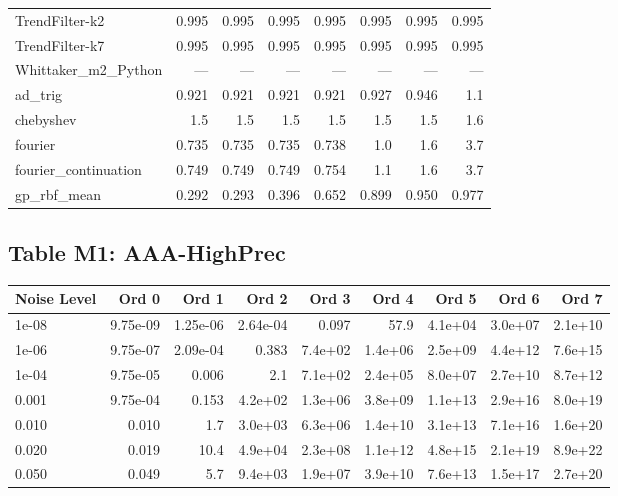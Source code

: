 \begin{longtable}{lrrrrrrr}
TrendFilter-k2 & 0.995 & 0.995 & 0.995 & 0.995 & 0.995 & 0.995 & 0.995 \\
TrendFilter-k7 & 0.995 & 0.995 & 0.995 & 0.995 & 0.995 & 0.995 & 0.995 \\
Whittaker\_m2\_Python & --- & --- & --- & --- & --- & --- & --- \\
ad\_trig & 0.921 & 0.921 & 0.921 & 0.921 & 0.927 & 0.946 & 1.1 \\
chebyshev & 1.5 & 1.5 & 1.5 & 1.5 & 1.5 & 1.5 & 1.6 \\
fourier & 0.735 & 0.735 & 0.735 & 0.738 & 1.0 & 1.6 & 3.7 \\
fourier\_continuation & 0.749 & 0.749 & 0.749 & 0.754 & 1.1 & 1.6 & 3.7 \\
gp\_rbf\_mean & 0.292 & 0.293 & 0.396 & 0.652 & 0.899 & 0.950 & 0.977 \\
\bottomrule
\end{longtable}

\clearpage



\subsection*{Table M1: AAA-HighPrec}

\begin{longtable}{lrrrrrrrr}
\toprule
\textbf{Noise Level} & \textbf{Ord 0} & \textbf{Ord 1} & \textbf{Ord 2} & \textbf{Ord 3} & \textbf{Ord 4} & \textbf{Ord 5} & \textbf{Ord 6} & \textbf{Ord 7} \\
\midrule
\endhead
1e-08 & 9.75e-09 & 1.25e-06 & 2.64e-04 & 0.097 & 57.9 & 4.1e+04 & 3.0e+07 & 2.1e+10 \\
1e-06 & 9.75e-07 & 2.09e-04 & 0.383 & 7.4e+02 & 1.4e+06 & 2.5e+09 & 4.4e+12 & 7.6e+15 \\
1e-04 & 9.75e-05 & 0.006 & 2.1 & 7.1e+02 & 2.4e+05 & 8.0e+07 & 2.7e+10 & 8.7e+12 \\
0.001 & 9.75e-04 & 0.153 & 4.2e+02 & 1.3e+06 & 3.8e+09 & 1.1e+13 & 2.9e+16 & 8.0e+19 \\
0.010 & 0.010 & 1.7 & 3.0e+03 & 6.3e+06 & 1.4e+10 & 3.1e+13 & 7.1e+16 & 1.6e+20 \\
0.020 & 0.019 & 10.4 & 4.9e+04 & 2.3e+08 & 1.1e+12 & 4.8e+15 & 2.1e+19 & 8.9e+22 \\
0.050 & 0.049 & 5.7 & 9.4e+03 & 1.9e+07 & 3.9e+10 & 7.6e+13 & 1.5e+17 & 2.7e+20 \\
\bottomrule
\end{longtable}

